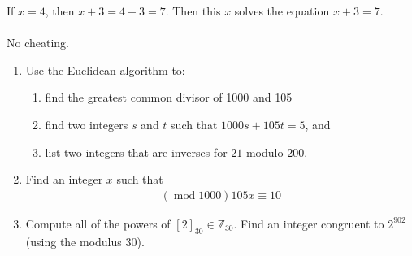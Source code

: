 \documentclass[12pt]{article}
\begin{document}
If $x=4$, then $x+3=4+3=7$.  Then this $x$ solves the equation $x+3=7$.
\\
\\
No cheating.
\newpage
\begin{enumerate}
\item
Use the Euclidean algorithm to:\begin{enumerate}
\item find the greatest common divisor of 1000 and 105
\item find two integers $s$ and $t$ such that $1000s+105t=5$, and
\item list two integers that are inverses for $21$ modulo $200$.
\end{enumerate}
\newpage
\item
Find an integer $x$ such that
\begin{align*}
(\operatorname{mod} 1000) 105x\equiv 10
\end{align*}
\newpage
\item
Compute all of the powers of $[2]_{30}\in \mathbb{Z}_{30}$.  Find an integer congruent to $2^{902}$ (using the modulus 30).


\end{enumerate}
\end{document}
